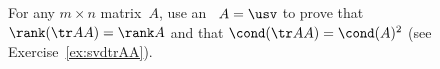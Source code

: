 \begin{exercise} \label{ex:ctrAA} 
For any \(m\times n\) matrix~\(A\), use an \svd\ \(A=\usv\) to prove that \(\rank(\tr AA)=\rank A\) and that \(\cond(\tr AA)=\cond(A)^2\)
(see Exercise~\ref{ex:svdtrAA}).
\end{exercise}





%





